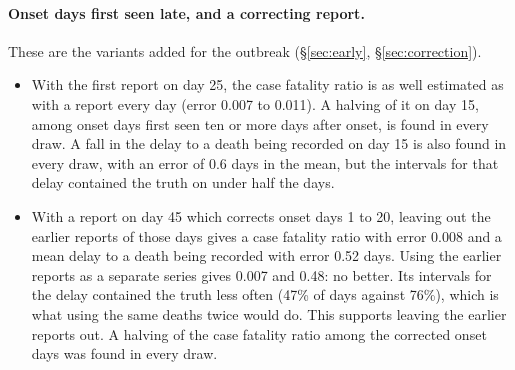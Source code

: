 \documentclass[11pt,a4paper]{article}
\begin{document}
\paragraph{Onset days first seen late, and a correcting report.} These are
the variants added for the outbreak (\S\ref{sec:early},
\S\ref{sec:correction}).
\begin{itemize}
\item With the first report on day 25, the case fatality ratio is as well
estimated as with a report every day (error 0.007 to 0.011). A halving of
it on day 15, among onset days first seen ten or more days after onset, is
found in every draw. A fall in the delay to a death being recorded on day
15 is also found in every draw, with an error of 0.6 days in the mean, but
the intervals for that delay contained the truth on under half the days.
\item With a report on day 45 which corrects onset days 1 to 20, leaving
out the earlier reports of those days gives a case fatality ratio with
error 0.008 and a mean delay to a death being recorded with error 0.52
days. Using the earlier reports as a separate series gives 0.007 and 0.48:
no better. Its intervals for the delay contained the truth less often (47\%
of days against 76\%), which is what using the same deaths twice would do.
This supports leaving the earlier reports out. A halving of the case
fatality ratio among the corrected onset days was found in every draw.
\end{itemize}
\end{document}
